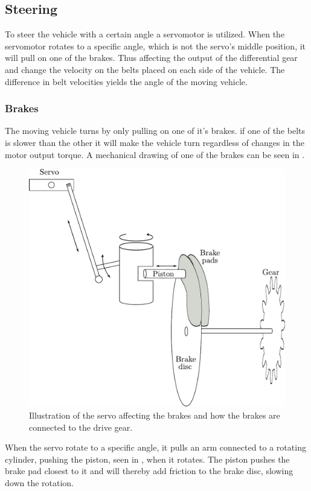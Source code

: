 \subsection{Steering}
To steer the vehicle with a certain angle a servomotor is utilized. When the servomotor rotates to a specific angle, which is not the servo's middle position, it will pull on one of the brakes. Thus affecting the output of the differential gear and change the velocity on the belts placed on each side of the vehicle. The difference in belt velocities yields the angle of the moving vehicle.

\subsubsection{Brakes}
The moving vehicle turns by only pulling on one of it's brakes. if one of the belts is slower than the other it will make the vehicle turn regardless of changes in the motor output torque. A mechanical drawing of one of the brakes can be seen in . 

 \begin{figure}[H]
	\centering
	\includegraphics[scale=0.6]{figures/brakeDescription.pdf}
	\caption{Illustration of the servo affecting the brakes and how the brakes are connected to the drive gear.}
	\label{Brakes}
\end{figure}\vspace{-5mm}

When the servo rotate to a specific angle, it pulls an arm connected to a rotating cylinder, pushing the piston, seen in , when it rotates. The piston pushes the brake pad closest to it and will thereby add friction to the brake disc, slowing down the rotation.
